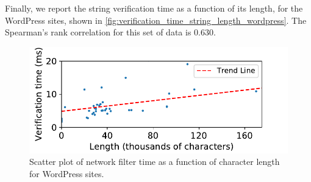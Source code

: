 Finally, we report the string verification time as a function of its length, for the WordPress sites, shown in \autoref{fig:verification_time_string_length_wordpress}. The Spearman's rank correlation for this set of data is 0.630.


\begin{figure}[h]
	\begin{center}
	\includegraphics[scale=0.55]{results/string_length_vs_verification_time_wordpress_small.pdf}
	
	\caption{Scatter plot of network filter time as a function of character length for WordPress sites.}
	\label{fig:verification_time_string_length_wordpress}
\end{center}
\end{figure}
